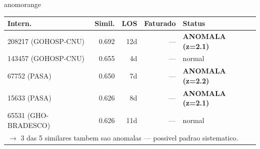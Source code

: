 \documentclass[a4paper,10pt]{article}
\begin{document}
\begin{anomalycard}[Internacao 163980 | GHO-PETROBRAS | ALTO (z=4.55)]{anomorange}
\begin{tabular}{l r r r l}\toprule\textbf{Intern.} & \textbf{Simil.} & \textbf{LOS} & \textbf{Faturado} & \textbf{Status} \\\midrule
208217 (GOHOSP-CNU) & 0.692 & 12d & --- & \textcolor{anomred}{\textbf{ANOMALA (z=2.1)}} \\
143457 (GOHOSP-CNU) & 0.655 & 4d & --- & \textcolor{jcubeblue}{normal} \\
67752 (PASA) & 0.650 & 7d & --- & \textcolor{anomred}{\textbf{ANOMALA (z=2.2)}} \\
15633 (PASA) & 0.626 & 8d & --- & \textcolor{anomred}{\textbf{ANOMALA (z=2.1)}} \\
65531 (GHO-BRADESCO) & 0.626 & 11d & --- & \textcolor{jcubeblue}{normal} \\
\multicolumn{5}{l}{\textcolor{anomred}{\small $\rightarrow$ 3 das 5 similares tambem sao anomalas --- possivel padrao sistematico.}} \\
\bottomrule\end{tabular}


\end{anomalycard}

\newpage
\end{document}
